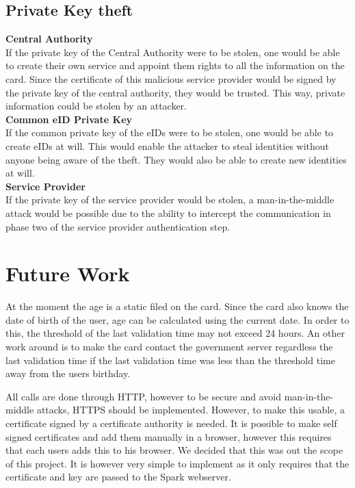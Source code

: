 \documentclass[12pt]{report}
\begin{document}
\subsection{Private Key theft}
\textbf{Central Authority}\\
If the private key of the Central Authority were to be stolen, one would be able to create their own service and appoint them rights to all the information on the card. Since the certificate of this malicious service provider would be signed by the private key of the central authority, they would be trusted.
This way, private information could be stolen by an attacker.\\
\textbf{Common eID Private Key}\\
If the common private key of the eIDs were to be stolen, one would be able to create eIDs at will. This would enable the attacker to steal identities without anyone being aware of the theft. They would also be able to create new identities at will.\\
\textbf{Service Provider}\\
If the private key of the service provider would be stolen, a man-in-the-middle attack would be possible due to the ability to intercept the communication in phase two of the service provider authentication step.

\section{Future Work}
At the moment the age is a static filed on the card. Since the card also knows the date of birth of the user, age can be calculated using the current date. In order to this, the threshold of the last validation time may not exceed 24 hours. An other work around is to make the card contact the government server regardless the last validation time if the last validation time was less than the threshold time away from the users birthday.

All calls are done through HTTP, however to be secure and avoid man-in-the-middle attacks, HTTPS should be implemented. However, to make this usable, a certificate signed by a certificate authority is needed. It is possible to make self signed certificates and add them manually in a browser, however this requires that each users adds this to his browser. We decided that this was out the scope of this project. It is however very simple to implement as it only requires that the certificate and key are passed to the Spark webserver.
\end{document}
